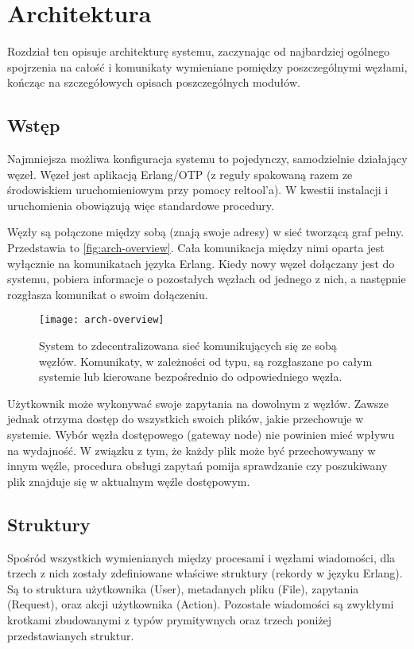 \section{Architektura}
Rozdział ten opisuje architekturę systemu, zaczynając od najbardziej ogólnego spojrzenia na całość i komunikaty wymieniane pomiędzy poszczególnymi węzłami, kończąc na szczegółowych opisach poszczególnych modułów.






\subsection{Wstęp}
Najmniejsza możliwa konfiguracja systemu to pojedynczy, samodzielnie działający węzeł. Węzeł jest aplikacją Erlang/OTP (z reguły spakowaną razem ze środowiskiem uruchomieniowym przy pomocy reltool'a). W kwestii instalacji i uruchomienia obowiązują więc standardowe procedury.

Węzły są połączone między sobą (znają swoje adresy) w sieć tworzącą graf pełny. Przedstawia to \autoref{fig:arch-overview}. Cała komunikacja między nimi oparta jest wyłącznie na komunikatach języka Erlang. Kiedy nowy węzeł dołączany jest do systemu, pobiera informacje o pozostałych węzłach od jednego z nich, a następnie rozgłasza komunikat o swoim dołączeniu.

\begin{figure}[!htbp]
	\centering
	\texttt{[image: arch-overview]}
	\caption[Diagram architektury systemu.]{System to zdecentralizowana sieć komunikujących się ze sobą węzłów. Komunikaty, w zależności od typu, są rozgłaszane po całym systemie lub kierowane bezpośrednio do odpowiedniego węzła.}
	\label{fig:arch-overview}
\end{figure}

Użytkownik może wykonywać swoje zapytania na dowolnym z węzłów. Zawsze jednak otrzyma dostęp do wszystkich swoich plików, jakie przechowuje w systemie. Wybór węzła dostępowego (gateway node) nie powinien mieć wpływu na wydajność. W związku z tym, że każdy plik może być przechowywany w innym węźle, procedura obsługi zapytań pomija sprawdzanie czy poszukiwany plik znajduje się w aktualnym węźle dostępowym.







\subsection{Struktury}
Spośród wszystkich wymienianych między procesami i węzłami wiadomości, dla trzech z nich zostały zdefiniowane właściwe struktury (rekordy w języku Erlang). Są to struktura użytkownika (User), metadanych pliku (File), zapytania (Request), oraz akcji użytkownika (Action). Pozostałe wiadomości są zwykłymi krotkami zbudowanymi z typów prymitywnych oraz trzech poniżej przedstawianych struktur.

